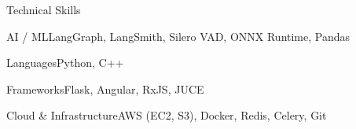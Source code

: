\documentclass[
	11pt
]{../template}
\begin{document}
	\begin{rSection}{T}{echnical Skills}
		\begin{rSet}{AI / ML}{LangGraph, LangSmith, Silero VAD, ONNX Runtime, Pandas}
		\end{rSet}
		\begin{rSet}{Languages}{Python, C++}
		\end{rSet}
		\begin{rSet}{Frameworks}{Flask, Angular, RxJS, JUCE}
		\end{rSet}
		\begin{rSet}{Cloud \& Infrastructure}{AWS (EC2, S3), Docker, Redis, Celery, Git}
		\end{rSet}
	\end{rSection}
\end{document}
